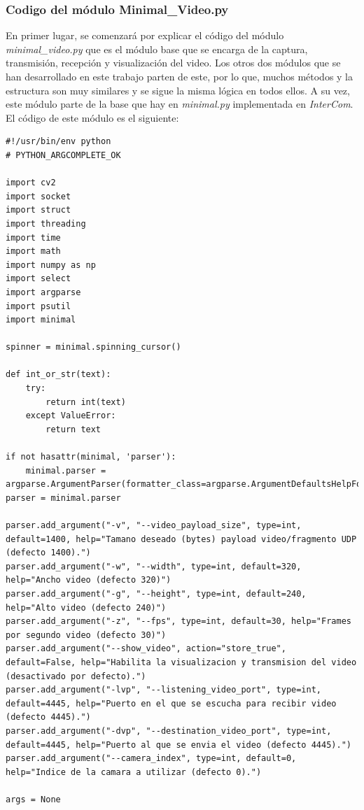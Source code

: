 \subsubsection{Codigo del módulo Minimal\_Video.py}

En primer lugar, se comenzará por explicar el código del módulo \textit{minimal\_video.py} que es el módulo base que se encarga de la captura, transmisión, recepción y visualización del video. Los otros dos módulos que se han desarrollado en este trabajo parten de este, por lo que, muchos métodos y la estructura son muy similares y se sigue la misma lógica en todos ellos. A su vez, este módulo parte de la base que hay en \textit{minimal.py} implementada en \textit{InterCom}. El código de este módulo es el siguiente:
\begin{lstlisting}[style=pythonstyle, caption={Comienzo del módulo \textit{minimal\_video.py} y sus parámetros}, label={lst:principio_clase_minimal}]
#!/usr/bin/env python
# PYTHON_ARGCOMPLETE_OK

import cv2
import socket
import struct
import threading
import time
import math
import numpy as np
import select
import argparse
import psutil
import minimal

spinner = minimal.spinning_cursor()

def int_or_str(text):
    try:
        return int(text)
    except ValueError:
        return text

if not hasattr(minimal, 'parser'):
    minimal.parser = argparse.ArgumentParser(formatter_class=argparse.ArgumentDefaultsHelpFormatter)
parser = minimal.parser

parser.add_argument("-v", "--video_payload_size", type=int, default=1400, help="Tamano deseado (bytes) payload video/fragmento UDP (defecto 1400).")
parser.add_argument("-w", "--width", type=int, default=320, help="Ancho video (defecto 320)")
parser.add_argument("-g", "--height", type=int, default=240, help="Alto video (defecto 240)")
parser.add_argument("-z", "--fps", type=int, default=30, help="Frames por segundo video (defecto 30)")
parser.add_argument("--show_video", action="store_true", default=False, help="Habilita la visualizacion y transmision del video (desactivado por defecto).")
parser.add_argument("-lvp", "--listening_video_port", type=int, default=4445, help="Puerto en el que se escucha para recibir video (defecto 4445).")
parser.add_argument("-dvp", "--destination_video_port", type=int, default=4445, help="Puerto al que se envia el video (defecto 4445).")
parser.add_argument("--camera_index", type=int, default=0, help="Indice de la camara a utilizar (defecto 0).")

args = None
\end{lstlisting}

